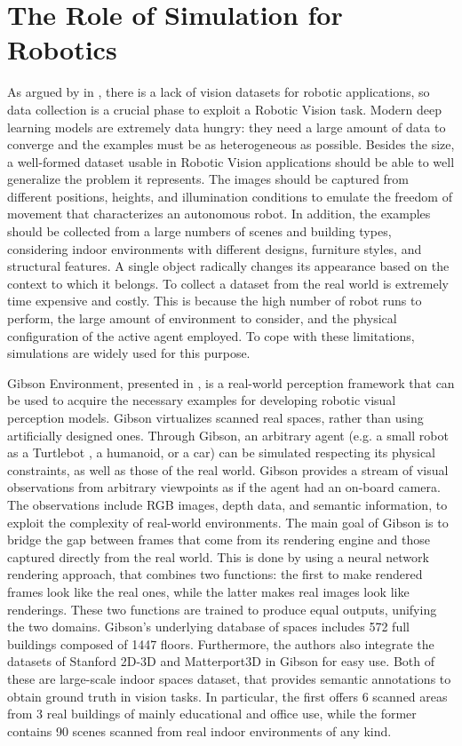  
 \section{The Role of Simulation for Robotics}
 \label{sec:importanceofsimulation}
 As argued by \citeauthor{surveydeeplimits} in \cite{surveydeeplimits}, there is a lack of vision datasets for robotic applications, so data collection is a crucial phase to exploit a Robotic Vision task. Modern deep learning models are extremely data hungry: they need a large amount of data to converge and the examples must be as heterogeneous as possible. Besides the size, a well-formed dataset usable in Robotic Vision applications should be able to well generalize the problem it represents. The images should be captured from different positions, heights, and illumination conditions to emulate the freedom of movement that characterizes an autonomous robot. In addition, the examples should be collected from a large numbers of scenes and building types, considering indoor environments with different designs, furniture styles, and structural features. A single object radically changes its appearance based on the context to which it belongs. To collect a dataset from the real world is extremely time expensive and costly. This is because the high number of robot runs to perform, the large amount of environment to consider, and the physical configuration of the active agent employed. To cope with these limitations, simulations are widely used for this purpose. 
 
 Gibson Environment, presented in \cite{gibson}, is a real-world perception framework that can be used to acquire the necessary examples for developing robotic visual perception models. Gibson virtualizes scanned real spaces, rather than using artificially designed ones. Through Gibson, an arbitrary agent (e.g. a small robot as a Turtlebot \cite{turtlebot2, turtlebot3}, a humanoid, or a car) can be simulated respecting its physical constraints, as well as those of the real world. Gibson provides a stream of visual observations from arbitrary viewpoints as if the agent had an on-board camera. The observations include RGB images, depth data, and semantic information, to exploit the complexity of real-world environments. The main goal of Gibson is to bridge the gap between frames that come from its rendering engine and those captured directly from the real world. This is done by using a neural network rendering approach, that combines two functions: the first to make rendered frames look like the real ones, while the latter makes real images look like renderings. These two functions are trained to produce equal outputs, unifying the two domains. Gibson’s underlying database of spaces includes 572 full buildings composed of 1447 floors. Furthermore, the authors also integrate the datasets of Stanford 2D-3D \cite{stanford2d3d} and Matterport3D \cite{matterport} in Gibson for easy use. Both of these are large-scale indoor spaces dataset, that provides semantic annotations to obtain ground truth in vision tasks. In particular, the first offers 6 scanned areas from 3 real buildings of mainly educational and office use, while the former contains 90 scenes scanned from real indoor environments of any kind.
 
